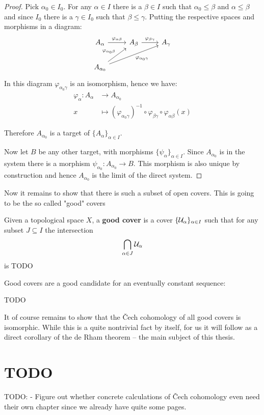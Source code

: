 \begin{proof}
Pick $\alpha_0 \in I_0$. For any $\alpha \in I$ there is a $\beta \in I$ such that $\alpha_0 \leqslant \beta$ and $\alpha \leqslant \beta$
and since $I_0$ there is a $\gamma \in I_0$ such that $\beta \leqslant \gamma$. Putting the respective spaces and morphisms in a diagram:
\[\begin{tikzcd}
	{A_\alpha} & {A_\beta} & {A_\gamma} \\
	{A_{\alpha_0}}
	\arrow["{\varphi_{\alpha \beta}}", from=1-1, to=1-2]
	\arrow["{\varphi_{\beta \gamma}}", from=1-2, to=1-3]
	\arrow["{\varphi_{\alpha_0 \beta}}", from=2-1, to=1-2]
	\arrow["{\varphi_{\alpha_0 \gamma}}"', from=2-1, to=1-3]
\end{tikzcd}\]
In this diagram $\varphi_{\alpha_0 \gamma}$ is an isomorphism, hence we have:
\begin{align*}
	\varphi_\alpha:
		A_\alpha &\to A_{\alpha_0} \\
		x &\mapsto (\varphi_{\alpha_0 \gamma})^{-1} \circ \varphi_{\beta \gamma} \circ \varphi_{\alpha \beta}(x)
\end{align*}

Therefore $A_{\alpha_0}$ is a target of $\{A_\alpha\}_{\alpha \in I}$.

Now let $B$ be any other target, with morphisms $\{\psi_\alpha\}_{\alpha \in I}$. Since $A_{\alpha_0}$
is in the system there is a morphism $\psi_{\alpha_0}: A_{\alpha_0} \to B$. This morphism is also unique
by construction and hence $A_{\alpha_0}$ is the limit of the direct system.
\end{proof}

Now it remains to show that there is such a subset of open covers. This is going to be the so called
"good" covers
\begin{definition}
Given a topological space $X$, a \textbf{good cover} is a cover $\{\mathcal{U}_\alpha\}_{\alpha \in I}$ such that
for any subset $J \subseteq I$ the intersection
\[
	\bigcap_{\alpha \in J} \mathcal{U}_\alpha
\]
is TODO
\end{definition}

Good covers are a good candidate for an eventually constant sequence:
\begin{lemma}
	TODO
\end{lemma}
It of course remains to show that the Čech cohomology of all good covers is isomorphic. While this is a
quite nontrivial fact by itself, for us it will follow as a direct corollary of the de Rham theorem – the
main subject of this thesis.

\section{TODO}
TODO:
	- Figure out whether concrete calculations of Čech cohomology even need their own chapter since we
	  already have quite some pages.
